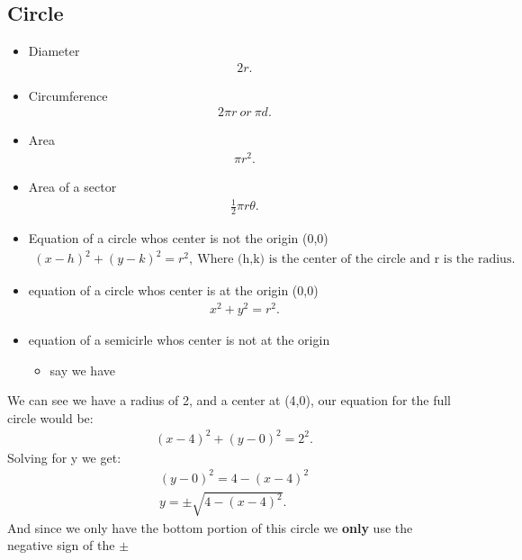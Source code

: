 \documentclass{report}
\begin{document}
    \subsection{Circle}
    \begin{itemize}
      \item Diameter
        \begin{align*}
          2r
        .\end{align*}
      \item Circumference
        \begin{align*}
          2\pi r\ or\ \pi d
        .\end{align*}
      \item Area
        \begin{align*}
          \pi r^{2}
        .\end{align*}
      \item Area of a sector
        \begin{align*}
          \frac{1}{2}\pi r\theta
        .\end{align*}
      \item Equation of a circle whos center is not the origin (0,0)
        \begin{align*}
          (x-h)^{2} + (y-k)^{2} = r^{2},\ \text{Where (h,k) is the center of the circle and r is the radius}
        .\end{align*}
      \item equation of a circle whos center is at the origin (0,0)
        \begin{align*}
          x^{2} +y^{2} = r^{2}
        .\end{align*}
      \item equation of a semicirle whos center is not at the origin
        \begin{itemize}
          \item say we have
        \end{itemize}
      \begin{figure}[ht]
          \centering
          \label{fig:fig1}
      \end{figure}
      \end{itemize}
      \bigbreak \noindent 
      We can see we have a radius of 2, and a center at (4,0), our equation for the full circle would be:
      \begin{align*}
        (x-4)^{2} + (y-0)^{2} = 2^{2}
      .\end{align*}
      \bigbreak \noindent 
      Solving for y we get:
      \begin{align*}
        (y-0)^{2} = 4 - (x-4)^{2} \\
        y = \pm\sqrt{4-(x-4)^{2}}
      .\end{align*}
      \bigbreak \noindent 
      And since we only have the bottom portion of this circle we \textbf{only} use the negative sign of the $\pm $
\end{document}

